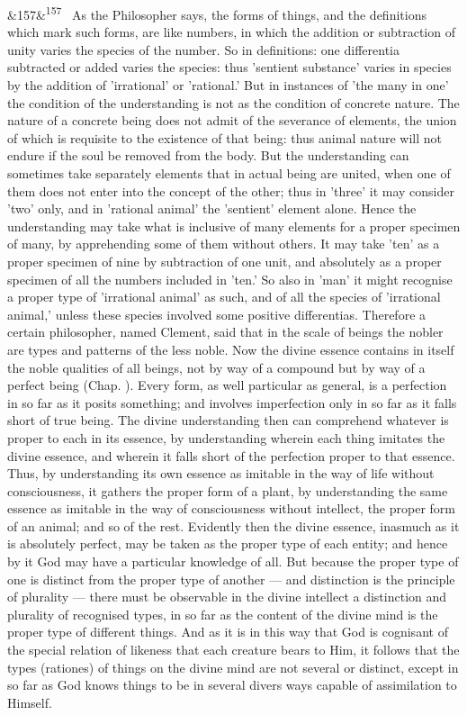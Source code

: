\documentclass[12pt]{article}
\newcommand{\para}[1][]{\par\noindent\ifx&#1&\else\textsuperscript{\footnotesize #1}~\fi}
\begin{document}
\para[157] As the Philosopher says, the forms of things, and the definitions which mark such forms, are like numbers, in which the addition or subtraction of unity varies the species of the number. So in definitions: one differentia subtracted or added varies the species: thus 'sentient substance' varies in species by the addition of 'irrational' or 'rational.' But in instances of 'the many in one' the condition of the understanding is not as the condition of concrete nature. The nature of a concrete being does not admit of the severance of elements, the union of which is requisite to the existence of that being: thus animal nature will not endure if the soul be removed from the body. But the understanding can sometimes take separately elements that in actual being are united, when one of them does not enter into the concept of the other; thus in 'three' it may consider 'two' only, and in 'rational animal' the 'sentient' element alone. Hence the understanding may take what is inclusive of many elements for a proper specimen of many, by apprehending some of them without others. It may take 'ten' as a proper specimen of nine by subtraction of one unit, and absolutely as a proper specimen of all the numbers included in 'ten.' So also in 'man' it might recognise a proper type of 'irrational animal' as such, and of all the species of 'irrational animal,' unless these species involved some positive differentias. Therefore a certain philosopher, named Clement, said that in the scale of beings the nobler are types and patterns of the less noble. Now the divine essence contains in itself the noble qualities of all beings, not by way of a compound but by way of a perfect being (Chap. ). Every form, as well particular as general, is a perfection in so far as it posits something; and involves imperfection only in so far as it falls short of true being. The divine understanding then can comprehend whatever is proper to each in its essence, by understanding wherein each thing imitates the divine essence, and wherein it falls short of the perfection proper to that essence. Thus, by understanding its own essence as imitable in the way of life without consciousness, it gathers the proper form of a plant, by understanding the same essence as imitable in the way of consciousness without intellect, the proper form of an animal; and so of the rest. Evidently then the divine essence, inasmuch as it is absolutely perfect, may be taken as the proper type of each entity; and hence by it God may have a particular knowledge of all. But because the proper type of one is distinct from the proper type of another --- and distinction is the principle of plurality --- there must be observable in the divine intellect a distinction and plurality of recognised types, in so far as the content of the divine mind is the proper type of different things. And as it is in this way that God is cognisant of the special relation of likeness that each creature bears to Him, it follows that the types (rationes) of things on the divine mind are not several or distinct, except in so far as God knows things to be in several divers ways capable of assimilation to Himself.
\end{document}
